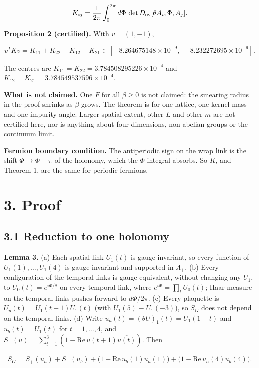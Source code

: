 \documentclass[11pt,a4paper]{article}
\begin{document}
\begin{equation*}
K_{ij}=\frac1{2\pi}\int_0^{2\pi}d\Phi\,\det D_{\rm ov}[\theta A_i,\Phi,A_j].
\end{equation*}


{\bfseries\boldmath Proposition 2 (certified).} With $v=(1,-1)$,


\begin{equation*}
v^TKv=K_{11}+K_{22}-K_{12}-K_{21}\in[-8.264675148\times10^{-9},\,-8.232272695\times10^{-9}].
\end{equation*}


The centres are $K_{11}=K_{22}=3.784508295226\times10^{-4}$ and $K_{12}=K_{21}=3.784549537596\times10^{-4}$.

{\bfseries\boldmath What is not claimed.} One $F$ for all $\beta\ge0$ is not claimed: the smearing radius in the proof shrinks as $\beta$ grows. The theorem is for one lattice, one kernel mass and one impurity angle. Larger spatial extent, other $L$ and other $m$ are not certified here, nor is anything about four dimensions, non-abelian groups or the continuum limit.

{\bfseries\boldmath Fermion boundary condition.} The antiperiodic sign on the wrap link is the shift $\Phi\to\Phi+\pi$ of the holonomy, which the $\Phi$ integral absorbs. So $K$, and Theorem 1, are the same for periodic fermions.


\section*{3. Proof}

\subsection*{3.1 Reduction to one holonomy}
{\bfseries\boldmath Lemma 3.}
(a) Each spatial link $U_1(t)$ is gauge invariant, so every function of $U_1(1),\dots,U_1(4)$ is gauge invariant and supported in $\Lambda_+$.
(b) Every configuration of the temporal links is gauge-equivalent, without changing any $U_1$, to $U_0(t)=e^{i\Phi/8}$ on every temporal link, where $e^{i\Phi}=\prod_tU_0(t)$; Haar measure on the temporal links pushes forward to $d\Phi/2\pi$.
(c) Every plaquette is $U_p(t)=U_1(t+1)\overline{U_1(t)}$ (with $U_1(5)\equiv U_1(-3)$), so $S_G$ does not depend on the temporal links.
(d) Write $u_a(t)=(\theta U)_1(t)=U_1(1-t)$ and $u_b(t)=U_1(t)$ for $t=1,\dots,4$, and $S_+(u)=\sum_{t=1}^{3}(1-\mathrm{Re}\,u(t+1)\overline{u(t)})$. Then


\begin{equation*}
S_G=S_+(u_a)+S_+(u_b)+\big(1-\mathrm{Re}\,u_b(1)\overline{u_a(1)}\big)+\big(1-\mathrm{Re}\,u_a(4)\overline{u_b(4)}\big).
\end{equation*}
\end{document}
